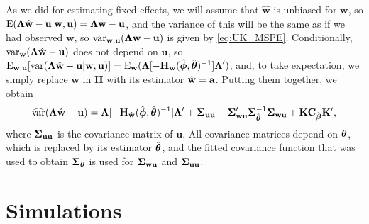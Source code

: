\documentclass[12pt, titlepage]{article}
\begin{document}
As we did for estimating fixed effects, we will assume that $\hat{\mathbf{w}}$ is unbiased for $\mathbf{w}$, so $\textrm{E}(\mbox{\boldmath $\Lambda$}\hat{\mathbf{w}}-\mathbf{u}|\mathbf{w},\mathbf{u}) = \mbox{\boldmath $\Lambda$}\mathbf{w}-\mathbf{u}$, and the variance of this will be the same as if we had observed $\mathbf{w}$, so $\textrm{var}_{\mathbf{w},\mathbf{u}}(\mbox{\boldmath $\Lambda$}\mathbf{w}-\mathbf{u})$ is given by \eqref{eq:UK_MSPE}. Conditionally, $\textrm{var}_{\hat{\mathbf{w}}}(\mbox{\boldmath $\Lambda$}\hat{\mathbf{w}}-\mathbf{u})$ does not depend on $\mathbf{u}$, so $\textrm{E}_{\mathbf{w},\mathbf{u}}[\textrm{var}(\mbox{\boldmath $\Lambda$}\hat{\mathbf{w}} -\mathbf{u}|\mathbf{w},\mathbf{u})] = \textrm{E}_{\mathbf{w}}(\mbox{\boldmath $\Lambda$}[-\mathbf{H}_{\mathbf{w}}(\hat{\boldsymbol{\phi}},\hat{\boldsymbol{\theta}})^{-1}]\mbox{\boldmath $\Lambda$}^{\prime})$, and, to take expectation, we simply replace $\mathbf{w}$ in $\mathbf{H}$ with its estimator $\hat{\mathbf{w}} = \mathbf{a}$.  Putting them together, we obtain
\begin{equation} \label{eq:sglmm_varpred}
\widehat{\textrm{var}}(\mbox{\boldmath $\Lambda$}\hat{\mathbf{w}}-\mathbf{u}) = \mbox{\boldmath $\Lambda$}[-\mathbf{H}_{\hat{\mathbf{w}}}(\hat{\boldsymbol{\phi}},\hat{\boldsymbol{\theta}})^{-1}]\mbox{\boldmath $\Lambda$}^{\prime} + \mbox{\boldmath $\Sigma$}_{\mathbf{u}\mathbf{u}} - \mbox{\boldmath $\Sigma$}_{\mathbf{w}\mathbf{u}}^{\prime}\mbox{\boldmath $\Sigma$}_{\hat{\boldsymbol{\theta}}}^{-1}\mbox{\boldmath $\Sigma$}_{\mathbf{w}\mathbf{u}} + \mathbf{K}\mathbf{C}_{\hat{\boldsymbol{\beta}}}\mathbf{K}^{\prime},
\end{equation}
where $\mbox{\boldmath $\Sigma$}_{\mathbf{u}\mathbf{u}}$ is the covariance matrix of $\mathbf{u}$.  All covariance matrices depend on $\boldsymbol{\theta}$, which is replaced by its estimator $\hat{\boldsymbol{\theta}}$, and the fitted covariance function that was used to obtain $\mbox{\boldmath $\Sigma$}_{\boldsymbol{\theta}}$ is used for $\mbox{\boldmath $\Sigma$}_{\mathbf{w}\mathbf{u}}$ and $\mbox{\boldmath $\Sigma$}_{\mathbf{u}\mathbf{u}}$.


\section{Simulations}
\end{document}
